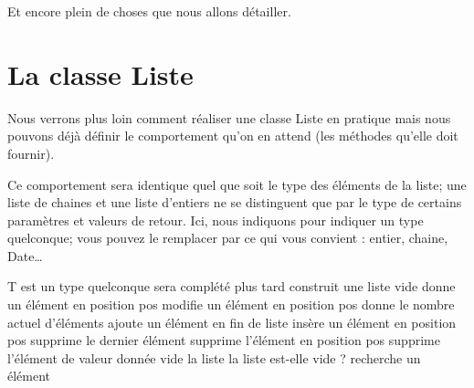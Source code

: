 	Et encore plein de choses que nous allons détailler.
	
	\section{La classe Liste}
	
		Nous verrons plus loin comment réaliser une classe Liste en pratique 
		mais nous pouvons déjà définir le comportement qu’on en attend 
		(les méthodes qu’elle doit fournir).
		
		Ce comportement sera identique quel que soit le type des éléments
		de la liste; une liste de chaines et une liste d'entiers
		ne se distinguent que par le type de certains paramètres
		et valeurs de retour.
		Ici, nous indiquons  pour indiquer un type quelconque;
		vous pouvez le remplacer par ce qui vous convient : 
		entier, chaine, Date\dots
		
		\begin{LDA}
				\RComment T est un type quelconque
				\Private
					\LComment sera complété plus tard	
				\Public
						\RComment construit une liste vide
						\RComment donne un élément en position pos
						\RComment modifie un élément en position pos
						\RComment donne le nombre actuel d’éléments
						\RComment ajoute un élément en fin de liste
						\RComment insère un élément en position pos
						\RComment supprime le dernier élément
						\RComment supprime l'élément en position pos
						\RComment supprime l'élément de valeur donnée
						\RComment vide la liste
						\RComment la liste est-elle vide ?
						\RComment recherche un élément
				\EndClass
		\end{LDA}
		
		\bigskip
		

